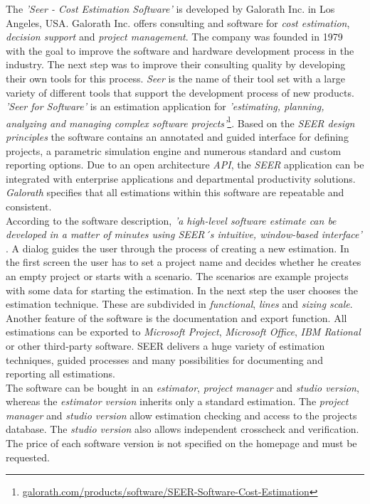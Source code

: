The \textit{'Seer - Cost Estimation Software'} is developed by Galorath Inc. in Los Angeles, USA. Galorath Inc. offers consulting and software for \textit{cost estimation}, \textit{decision support} and \textit{project management}. The company was founded in 1979 with the goal to improve the software and hardware development process in the industry. The next step was to improve their consulting quality by developing their own tools for this process. \textit{Seer} is the name of their tool set with a large variety of different tools that support the development process of new products.
\\
\textit{'Seer for Software'} is an estimation application for \textit{'estimating, planning, analyzing and managing complex software projects'}\footnote{\url{galorath.com/products/software/SEER-Software-Cost-Estimation}}. Based on the \textit{SEER design principles} the software contains an annotated and guided interface for defining projects, a parametric simulation engine and numerous standard and custom reporting options. Due to an open architecture \textit{API}, the \textit{SEER} application can be integrated with enterprise applications and departmental productivity solutions. \textit{Galorath} specifies that all estimations within this software are repeatable and consistent.
\\
According to the software description, \textit{'a high-level software estimate can be developed in a matter of minutes using SEER´s intuitive, window-based interface'} \cite{pricesystems}. A dialog guides the user through the process of creating a new estimation. In the first screen the user has to set a project name and decides whether he creates an empty project or starts with a scenario. The scenarios are example projects with some data for starting the estimation. In the next step the user chooses the estimation technique. These are subdivided in \textit{functional}, \textit{lines} and \textit{sizing scale}. Another feature of the software is the documentation and export function. All estimations can be exported to \textit{Microsoft Project}, \textit{Microsoft Office}, \textit{IBM Rational} or other third-party software. SEER delivers a huge variety of estimation techniques, guided processes and many possibilities for documenting and reporting all estimations.
\\
The software can be bought in an \textit{estimator}, \textit{project manager} and \textit{studio version}, whereas the \textit{estimator version} inherits only a standard estimation. The \textit{project manager} and \textit{studio version} allow estimation checking and access to the projects database. The \textit{studio version} also allows independent crosscheck and verification. The price of each software version is not specified on the homepage and must be requested.

